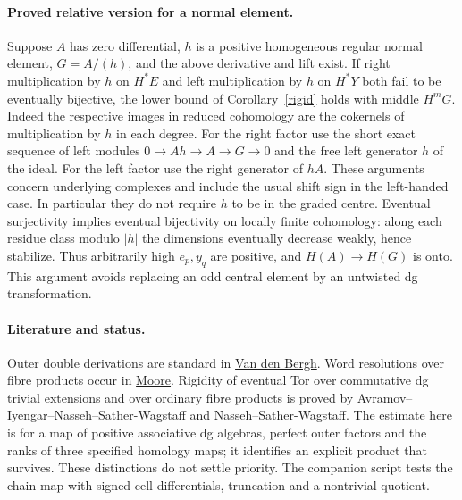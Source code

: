 \documentclass[11pt]{article}
\begin{document}
\paragraph{Proved relative version for a normal element.}
Suppose $A$ has zero differential, $h$ is a positive homogeneous regular
normal element, $G=A/(h)$, and the above derivative and lift exist.
If right multiplication by $h$ on $H^*E$ and left multiplication by $h$
on $H^*Y$ both fail to be eventually bijective, the lower bound of
Corollary~\ref{rigid} holds with middle $H^mG$. Indeed the respective
images in reduced cohomology are the cokernels of multiplication by
$h$ in each degree. For the right factor use the short exact sequence
of left modules $0\to Ah\to A\to G\to0$ and the free left generator
$h$ of the ideal. For the left factor use the right generator of $hA$.
These arguments concern underlying complexes and include the usual shift
sign in the left-handed case. In particular they do not require $h$
to be in the graded centre. Eventual surjectivity implies eventual
bijectivity on locally finite cohomology: along each residue class modulo
$|h|$ the dimensions eventually decrease weakly, hence stabilize.
Thus arbitrarily high $e_p,y_q$ are positive, and $H(A)\to H(G)$ is onto.
This argument avoids replacing an odd central element by an untwisted
dg transformation.

\paragraph{Literature and status.}
Outer double derivations are standard in
\href{https://arxiv.org/abs/math/0410528}{Van den Bergh}.
Word resolutions over fibre products occur in
\href{https://arxiv.org/abs/0704.3631}{Moore}. Rigidity of eventual
Tor over commutative dg trivial extensions and over ordinary fibre
products is proved by
\href{https://arxiv.org/abs/1508.00748}{Avramov--Iyengar--Nasseh--Sather-Wagstaff}
and \href{https://arxiv.org/abs/1603.05711}{Nasseh--Sather-Wagstaff}.
The estimate here is for a map of positive associative dg algebras,
perfect outer factors and the ranks of three specified homology maps;
it identifies an explicit product that survives. These distinctions do
not settle priority. The companion script tests the chain map with
signed cell differentials, truncation and a nontrivial quotient.
\end{document}
